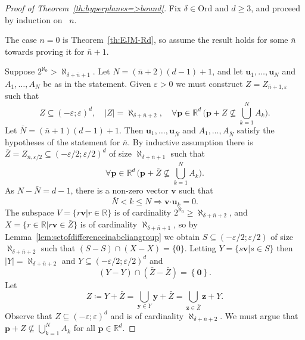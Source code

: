 \documentclass[12pt]{amsart}
\newcommand{\FORALL}[1]{\forall {#1} \, }
\newcommand{\R}{\mathbb{R}}	%
\newcommand{\IMPLIES}{\Rightarrow }
\newcommand{\Mid}{\boldsymbol\mid}			%
\newcommand{\set}[1]{\mathopen \{ {#1} \mathclose \}} %
\newcommand{\setof}[2]{\mathopen \{{#1}\Mid{#2} \mathclose\}} %
\newcommand{\setLR}[1]{\left \{ {#1} \right \}} %
\newcommand{\card}[1]{\mathopen | #1 \mathclose |}		%
\newcommand{\On}{\mathord{\mathrm{Ord}}}		%
\theoremstyle{plain}
\theoremstyle{definition}
\theoremstyle{remark}
\begin{document}
\begin{proof}[Proof of Theorem~\ref{th:hyperplanes=>bound}]
Fix \( \delta \in \On \) and \( d \geq 3 \), and proceed by induction on  \( n \).

The case \( n = 0 \) is Theorem~\ref{th:EJM-Rd}, so assume the result holds for some \( \bar{n} \) towards proving it for \( \bar{n} + 1 \).

Suppose \( 2^{\aleph_0} > \aleph_{ \delta + \bar{n} + 1 } \).
Let \( N = ( \bar{n} + 2 ) ( d - 1 ) + 1 \), and let \( \mathbf{u}_1 , \dots , \mathbf{u}_ N \) and \( A_1 , \dots , A_ N \) be as in the statement.
Given \( \varepsilon > 0 \) we must construct \( Z = Z_{ \bar{n} + 1 , \varepsilon } \) such that 
\[ 
Z \subseteq ( - \varepsilon ; \varepsilon )^d , \quad \card{Z} = \aleph_{ \delta + \bar{n} + 2 } , \quad \FORALL{ \mathbf{p} \in \R^d } \bigl ( \mathbf{p} + Z \nsubseteq \textstyle \bigcup_{k = 1 }^N A_k \bigr ) .
\] 
Let \( \bar{N} = ( \bar{n} + 1 ) ( d - 1 ) + 1 \).
Then \( \mathbf{u}_1 , \dots , \mathbf{u}_{\bar{N} } \) and \( A_1 , \dots , A_{ \bar{N} } \) satisfy the hypotheses of the statement for \( \bar{n} \).
By inductive assumption there is \( \bar{Z} = Z_{ \bar{n} , \varepsilon / 2 } \subseteq ( - \varepsilon / 2 ; \varepsilon / 2 )^d \) of size \( \aleph_{ \delta + \bar{n} + 1 } \) such that 
\begin{equation}\label{eq:th:hyperplanes=>bound-1}
 \FORALL{ \mathbf{p} \in \R^d } \bigl ( \mathbf{p} + \bar{Z} \nsubseteq \textstyle \bigcup_{ k = 1 }^{\bar{N}} A_k \bigr ) .
\end{equation}
As \( N - \bar{N} = d - 1 \), there is a non-zero vector \( \mathbf{v} \) such that 
\begin{equation}\label{th:hyperplanes=>bound-2}
 \bar{N} < k \leq N \IMPLIES \mathbf{v} \boldsymbol{\cdot} \mathbf{u}_k = 0 . 
\end{equation}
The subspace \( V = \setof{ r \mathbf{v}}{ r \in \R } \) is of cardinality \( 2^{\aleph_0 } \geq \aleph_{ \delta + \bar{n} + 2 } \), and \( X = \setof{ r \in \R }{ r \mathbf{v} \in \bar{Z}} \) is of cardinality \( \aleph_{ \delta + \bar{n} + 1 } \), so by Lemma~\ref{lem:setofdifferenceinabeliangroup} we obtain \( S \subseteq ( - \varepsilon / 2 ; \varepsilon / 2 ) \) of size \( \aleph_{ \delta + \bar{n} + 2 } \) such that \( ( S - S ) \cap ( X - X ) = \set{0} \).
Letting \( Y = \setof{ s \mathbf{v} }{ s \in S } \) then \( \card{Y} = \aleph_{ \delta + \bar{n} + 2 } \) and \( Y \subseteq ( - \varepsilon / 2 ; \varepsilon / 2 )^d \) and 
\[
 ( Y - Y ) \cap ( \bar{Z} - \bar{Z} ) = \setLR{\mathbf{0}} .
\]
Let 
\[
 Z \coloneqq Y + \bar{Z}= \textstyle \bigcup_{ \mathbf{y} \in Y} \mathbf{y} + \bar{Z} = \bigcup_{ \mathbf{z} \in \bar{Z} } \mathbf{z} + Y .
\]
Observe that \( Z \subseteq ( - \varepsilon ; \varepsilon )^d \) and is of cardinality \( \aleph_{ \delta + \bar{n} + 2 } \).
We must argue that \( \mathbf{p} + Z \nsubseteq \bigcup_{ k = 1 }^ N A_k \) for all \( \mathbf{p} \in \R^d \).


\end{proof}
\end{document}
